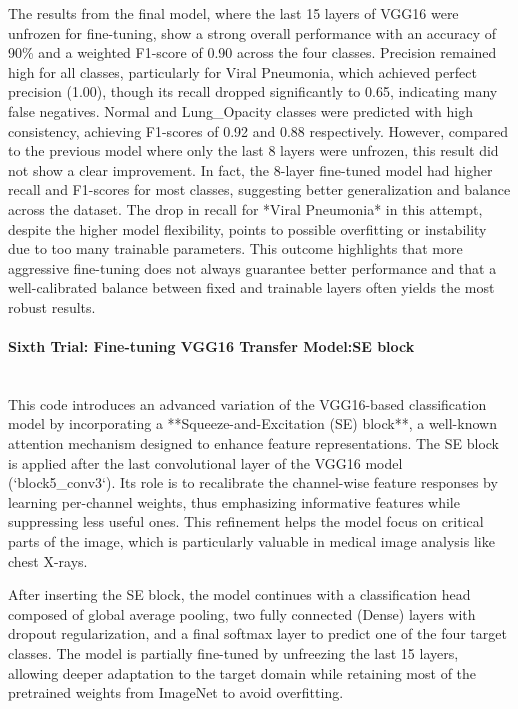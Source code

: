 \documentclass{article}
\begin{document}
The results from the final model, where the last 15 layers of VGG16 were unfrozen for fine-tuning, show a strong overall performance with an accuracy of 90\% and a weighted F1-score of 0.90 across the four classes. Precision remained high for all classes, particularly for Viral Pneumonia, which achieved perfect precision (1.00), though its recall dropped significantly to 0.65, indicating many false negatives. Normal and Lung\_Opacity classes were predicted with high consistency, achieving F1-scores of 0.92 and 0.88 respectively. 
However, compared to the previous model where only the last 8 layers were unfrozen, this result did not show a clear improvement. In fact, the 8-layer fine-tuned model had higher recall and F1-scores for most classes, suggesting better generalization and balance across the dataset. The drop in recall for *Viral Pneumonia* in this attempt, despite the higher model flexibility, points to possible overfitting or instability due to too many trainable parameters. This outcome highlights that more aggressive fine-tuning does not always guarantee better performance and that a well-calibrated balance between fixed and trainable layers often yields the most robust results.

\paragraph{Sixth Trial: Fine-tuning VGG16 Transfer Model:SE block}\mbox{}\\

This code introduces an advanced variation of the VGG16-based classification model by incorporating a **Squeeze-and-Excitation (SE) block**, a well-known attention mechanism designed to enhance feature representations. The SE block is applied after the last convolutional layer of the VGG16 model (`block5\_conv3`). Its role is to recalibrate the channel-wise feature responses by learning per-channel weights, thus emphasizing informative features while suppressing less useful ones. This refinement helps the model focus on critical parts of the image, which is particularly valuable in medical image analysis like chest X-rays.

After inserting the SE block, the model continues with a classification head composed of global average pooling, two fully connected (Dense) layers with dropout regularization, and a final softmax layer to predict one of the four target classes. The model is partially fine-tuned by unfreezing the last 15 layers, allowing deeper adaptation to the target domain while retaining most of the pretrained weights from ImageNet to avoid overfitting.
\end{document}
